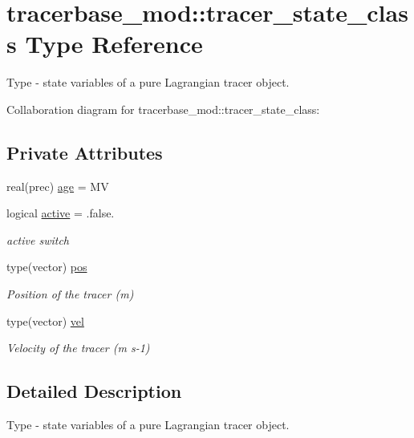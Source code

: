 \hypertarget{structtracerbase__mod_1_1tracer__state__class}{}\section{tracerbase\+\_\+mod\+:\+:tracer\+\_\+state\+\_\+class Type Reference}
\label{structtracerbase__mod_1_1tracer__state__class}


Type -\/ state variables of a pure Lagrangian tracer object.  




Collaboration diagram for tracerbase\+\_\+mod\+:\+:tracer\+\_\+state\+\_\+class\+:
\subsection*{Private Attributes}
\begin{DoxyCompactItemize}
\item 
real(prec) \mbox{\hyperlink{structtracerbase__mod_1_1tracer__state__class_aabf14569a79276d6cdd0f0a537cfb046}{age}} = MV
\item 
logical \mbox{\hyperlink{structtracerbase__mod_1_1tracer__state__class_a40841af58b7434716bc8d87bf1b3b694}{active}} = .false.
\begin{DoxyCompactList}\small\item\em active switch \end{DoxyCompactList}\item 
type(vector) \mbox{\hyperlink{structtracerbase__mod_1_1tracer__state__class_a184b3ecbe519a6cc7468fa3060131ce0}{pos}}
\begin{DoxyCompactList}\small\item\em Position of the tracer (m) \end{DoxyCompactList}\item 
type(vector) \mbox{\hyperlink{structtracerbase__mod_1_1tracer__state__class_ae94928588f703077bae9de12c8e9d14b}{vel}}
\begin{DoxyCompactList}\small\item\em Velocity of the tracer (m s-\/1) \end{DoxyCompactList}\end{DoxyCompactItemize}


\subsection{Detailed Description}
Type -\/ state variables of a pure Lagrangian tracer object. 


